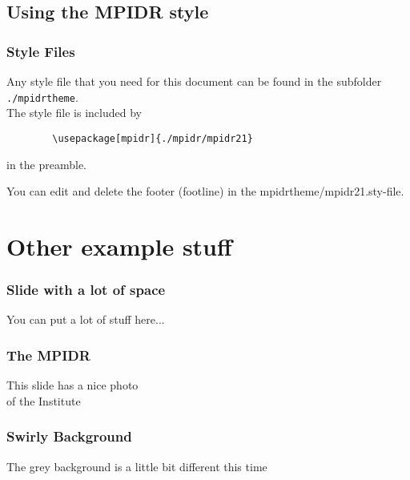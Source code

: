 \documentclass[aspectratio=169]{beamer}
\begin{document}
\subsection{Using the MPIDR style}
\begin{frame}[mpidrbackground=2, fragile]%
    \frametitle{Style Files}
  Any style file that you need for this document can be found in the subfolder \texttt{./mpidrtheme}.\\
  
  The style file is included by
	\begin{verbatim}
		\usepackage[mpidr]{./mpidr/mpidr21}
	\end{verbatim}
	in the preamble.
	
	You can edit and delete the footer (footline) in the mpidrtheme/mpidr21.sty-file.
	
\end{frame}


\section{Other example stuff}



\begin{frame}[mpidrbackground=4]
    \frametitle{Slide with a lot of space}
 You can put a lot of stuff here...
\end{frame}

\begin{frame}[mpidrbackground=3]
    \frametitle{The MPIDR}
  This slide has a nice photo \\ of the Institute
\end{frame}
\begin{frame}[mpidrbackground=5]
    \frametitle{Swirly Background}
  The grey background is a little bit different this time
\end{frame}




\end{document}

